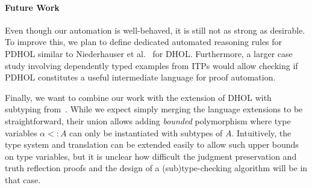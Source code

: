 \paragraph*{Future Work}
Even though our automation is well-behaved, it is still not as strong as desirable.
To improve this, we plan to define dedicated automated reasoning rules for PDHOL
similar to Niederhauser et al.~\cite{dhol_satallax} for DHOL. 
Furthermore, a larger case study involving dependently typed examples from ITPs %
would allow checking if PDHOL constitutes a
useful intermediate language for proof automation.  

Finally, we want to combine our work with the extension of DHOL with subtyping from~\cite{RR:dholsub}.
While we expect simply merging the language extensions to be straightforward, their union allows adding \emph{bounded} polymorphism where type variables $\alpha<:A$ can only be instantiated with subtypes of $A$.
Intuitively, the type system and translation can be extended easily to allow such upper
bounds on type variables, but it is unclear how difficult the judgment preservation and truth
reflection proofs and the design of a (sub)type-checking algorithm will be in that case.


